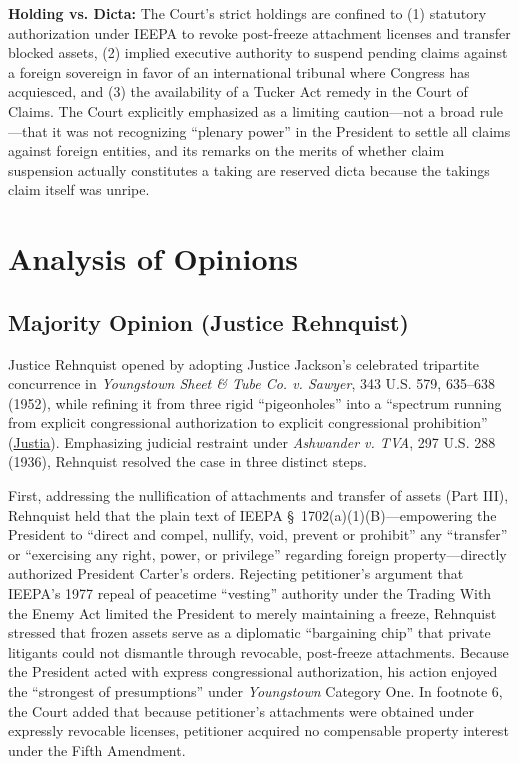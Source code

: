 \documentclass[12pt]{article}
\begin{document}
\textbf{Holding vs. Dicta:} The Court's strict holdings are confined to (1) statutory authorization under IEEPA to revoke post-freeze attachment licenses and transfer blocked assets, (2) implied executive authority to suspend pending claims against a foreign sovereign in favor of an international tribunal where Congress has acquiesced, and (3) the availability of a Tucker Act remedy in the Court of Claims. The Court explicitly emphasized as a limiting caution---not a broad rule---that it was not recognizing ``plenary power'' in the President to settle all claims against foreign entities, and its remarks on the merits of whether claim suspension actually constitutes a taking are reserved dicta because the takings claim itself was unripe.

\section{Analysis of Opinions}

\subsection{Majority Opinion (Justice Rehnquist)}
Justice Rehnquist opened by adopting Justice Jackson's celebrated tripartite concurrence in \textit{Youngstown Sheet \& Tube Co. v. Sawyer}, 343 U.S. 579, 635--638 (1952), while refining it from three rigid ``pigeonholes'' into a ``spectrum running from explicit congressional authorization to explicit congressional prohibition'' (\href{https://supreme.justia.com/cases/federal/us/453/654/}{Justia}). Emphasizing judicial restraint under \textit{Ashwander v. TVA}, 297 U.S. 288 (1936), Rehnquist resolved the case in three distinct steps.

First, addressing the nullification of attachments and transfer of assets (Part III), Rehnquist held that the plain text of IEEPA \S\ 1702(a)(1)(B)---empowering the President to ``direct and compel, nullify, void, prevent or prohibit'' any ``transfer'' or ``exercising any right, power, or privilege'' regarding foreign property---directly authorized President Carter's orders. Rejecting petitioner's argument that IEEPA's 1977 repeal of peacetime ``vesting'' authority under the Trading With the Enemy Act limited the President to merely maintaining a freeze, Rehnquist stressed that frozen assets serve as a diplomatic ``bargaining chip'' that private litigants could not dismantle through revocable, post-freeze attachments. Because the President acted with express congressional authorization, his action enjoyed the ``strongest of presumptions'' under \textit{Youngstown} Category One. In footnote 6, the Court added that because petitioner's attachments were obtained under expressly revocable licenses, petitioner acquired no compensable property interest under the Fifth Amendment.
\end{document}
